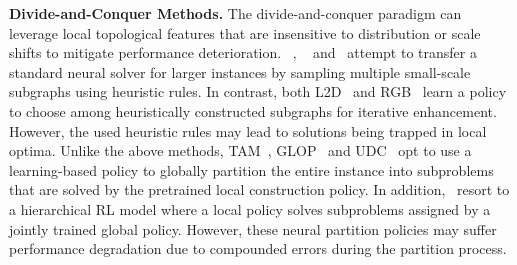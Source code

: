 \noindent \textbf{Divide-and-Conquer Methods.} The divide-and-conquer paradigm can leverage local topological features that are insensitive to distribution or scale shifts to mitigate performance deterioration. ~\citet{fu2021generalize}, ~\citet{kim2021learning} and~\citet{cheng2023select} attempt to transfer a standard neural solver for larger instances by sampling multiple small-scale subgraphs using heuristic rules. In contrast, both L2D~\cite{li2021learning} and RGB~\cite{zong2022rbg} learn a policy to choose among heuristically constructed subgraphs for iterative enhancement. However, the used heuristic rules may lead to solutions being trapped in local optima. Unlike the above methods, TAM~\cite{hou2023generalize}, GLOP~\cite{ye2024glop} and UDC~\cite{zheng2024udc} opt to use a learning-based policy to globally partition the entire instance into subproblems that are solved by the pretrained local construction policy. In addition,~\citet{pan2023h} resort to a hierarchical RL model where a local policy solves subproblems assigned by a jointly trained global policy. However, these neural partition policies may suffer performance degradation due to compounded errors during the partition process.